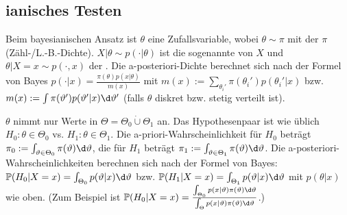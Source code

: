 \pagebreak

\subsection{%
    ianisches Testen%
}

\begin{Bem}
    Beim bayesianischen Ansatz ist $\theta$ eine Zufallsvariable,
    wobei $\theta \sim \pi$ mit der  $\pi$ (Zähl-/L.-B.-Dichte).
    $X|\theta \sim p(\cdot|\theta)$ ist die sogenannte  von $X$ und
    $\theta|X=x \sim p(\cdot,x)$ der .
    Die a-posteriori-Dichte berechnet sich nach der Formel von Bayes
    $p(\cdot|x) = \frac{\pi(\theta) p(x|\theta)}{m(x)}$ mit
    $m(x) := \sum_{\theta_i'} \pi(\theta_i') p(\theta_i'|x)$ bzw.
    $m(x) := \int \pi(\theta') p(\theta'|x) \d\theta'$
    (falls $\theta$ diskret bzw. stetig verteilt ist).
    
    $\theta$ nimmt nur Werte in $\Theta = \Theta_0 \mathbin{\dot{\cup}} \Theta_1$ an.
    Das Hypothesenpaar ist wie üblich $H_0\colon \theta \in \Theta_0$ vs.
    $H_1\colon \theta \in \Theta_1$.
    Die a-priori-Wahrscheinlichkeit für $H_0$ beträgt
    $\pi_0 := \int_{\theta \in \Theta_0} \pi(\theta)\d\theta$,
    die für $H_1$ beträgt $\pi_1 := \int_{\theta \in \Theta_1} \pi(\theta)\d\theta$.
    Die a-posteriori-Wahrscheinlichkeiten berechnen sich nach der Formel von Bayes:
    $\PP(H_0|X=x) = \int_{\Theta_0} p(\theta|x)\d\theta$ bzw.
    $\PP(H_1|X=x) = \int_{\Theta_1} p(\theta|x)\d\theta$
    mit $p(\theta|x)$ wie oben.
    (Zum Beispiel ist $\PP(H_0|X=x) = \frac{\int_{\Theta_0} p(x|\theta)\pi(\theta)\d\theta}
    {\int_\Theta p(x|\theta)\pi(\theta)\d\theta}$.)
\end{Bem}

\linie

